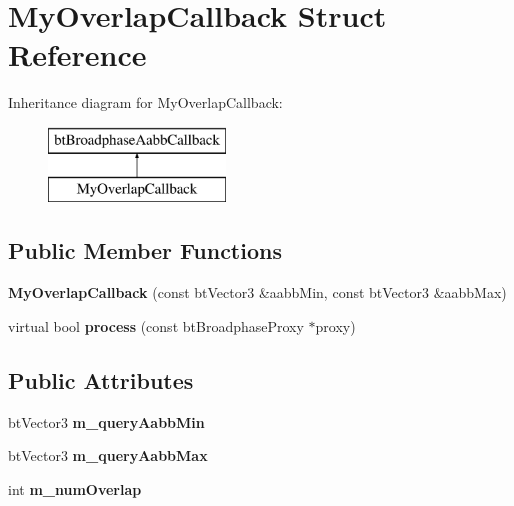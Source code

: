 \hypertarget{struct_my_overlap_callback}{}\section{My\+Overlap\+Callback Struct Reference}
\label{struct_my_overlap_callback}
Inheritance diagram for My\+Overlap\+Callback\+:\begin{figure}[H]
\begin{center}
\leavevmode
\includegraphics[height=2.000000cm]{struct_my_overlap_callback}
\end{center}
\end{figure}
\subsection*{Public Member Functions}
\begin{DoxyCompactItemize}
\item 
\mbox{\label{struct_my_overlap_callback_aab0ec53437855bd51e152d90c87bc308}} 
{\bfseries My\+Overlap\+Callback} (const bt\+Vector3 \&aabb\+Min, const bt\+Vector3 \&aabb\+Max)
\item 
\mbox{\label{struct_my_overlap_callback_a800de19342d0fe5b72e75e1f52c4f6c0}} 
virtual bool {\bfseries process} (const bt\+Broadphase\+Proxy $\ast$proxy)
\end{DoxyCompactItemize}
\subsection*{Public Attributes}
\begin{DoxyCompactItemize}
\item 
\mbox{\label{struct_my_overlap_callback_aef47a99d3560e8e3c9fc9acdf47446de}} 
bt\+Vector3 {\bfseries m\+\_\+query\+Aabb\+Min}
\item 
\mbox{\label{struct_my_overlap_callback_a7a4eef43032ad6c7762059a07a1ed463}} 
bt\+Vector3 {\bfseries m\+\_\+query\+Aabb\+Max}
\item 
\mbox{\label{struct_my_overlap_callback_aa956303c4fc43b1598be062437cf9595}} 
int {\bfseries m\+\_\+num\+Overlap}
\end{DoxyCompactItemize}


